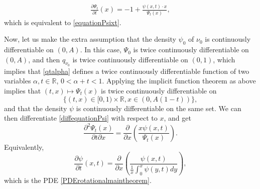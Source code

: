 \documentclass[11pt]{amsart}
\begin{document}
\begin{align}
\frac{\partial \Psi_t}{\partial t}(x) = -1 + \frac{\psi(x,t) \cdot x}{\Psi_t(x)},
\label{diffequationPsi}
\end{align}
which is equivalent to \eqref{equationPsixt}. 

Now, let us make the extra assumption that the density $\psi_0$ of $\nu_0$ is continuously differentiable on 
$(0,A)$. In this case, $\Psi_0$ is
twice continuously differentiable on $(0,A)$, 
and then $q_{\nu_0}$ is twice continuously differentiable on $(0,1)$, which implies 
that \eqref{qtalpha} defines 
a twice continuously differentiable function of 
two variables $\alpha, t \in \mathbb{R}$, 
$0 < \alpha + t < 1$. 
Applying the implicit function theorem 
as above implies that 
$(t, x) \mapsto \Psi_t (x)$ is twice continuously differentiable on 
$$\{(t,x) \in [0,1) \times \mathbb{R}, 
x \in (0, A(1-t))\},$$
and that the density $\psi$ is continuously differentiable on 
the same set. 
We can then differentiate \eqref{diffequationPsi} with respect to 
$x$, 
and get 
$$\frac{\partial^2 \Psi_t (x)}{\partial t \partial x} = \frac{\partial}{\partial x} 
\left( \frac{x \psi(x,t)}{\Psi_t (x)} \right).$$
Equivalently, 
$$
\frac{\partial \psi}{\partial t}(x,t) 
= \frac{\partial}{\partial x} \left( 
\frac{\psi(x,t)}{\frac{1}{x} \int_0^x \psi(y,t) dy} 
\right),$$
which is the PDE \eqref{PDErotationalmaintheorem}.
\end{document}
